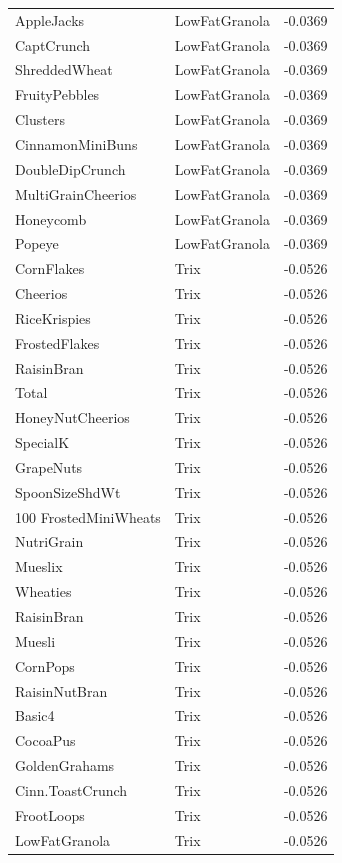 \begin{longtable}{llr}
AppleJacks & LowFatGranola & -0.0369 \\
CaptCrunch & LowFatGranola & -0.0369 \\
ShreddedWheat & LowFatGranola & -0.0369 \\
FruityPebbles & LowFatGranola & -0.0369 \\
Clusters & LowFatGranola & -0.0369 \\
CinnamonMiniBuns & LowFatGranola & -0.0369 \\
DoubleDipCrunch & LowFatGranola & -0.0369 \\
MultiGrainCheerios & LowFatGranola & -0.0369 \\
Honeycomb & LowFatGranola & -0.0369 \\
Popeye & LowFatGranola & -0.0369 \\
CornFlakes & Trix & -0.0526 \\
Cheerios & Trix & -0.0526 \\
RiceKrispies & Trix & -0.0526 \\
FrostedFlakes & Trix & -0.0526 \\
RaisinBran & Trix & -0.0526 \\
Total & Trix & -0.0526 \\
HoneyNutCheerios & Trix & -0.0526 \\
SpecialK & Trix & -0.0526 \\
GrapeNuts & Trix & -0.0526 \\
SpoonSizeShdWt & Trix & -0.0526 \\
100%
FrostedMiniWheats & Trix & -0.0526 \\
NutriGrain & Trix & -0.0526 \\
Mueslix & Trix & -0.0526 \\
Wheaties & Trix & -0.0526 \\
RaisinBran & Trix & -0.0526 \\
Muesli & Trix & -0.0526 \\
CornPops & Trix & -0.0526 \\
RaisinNutBran & Trix & -0.0526 \\
Basic4 & Trix & -0.0526 \\
CocoaPus & Trix & -0.0526 \\
GoldenGrahams & Trix & -0.0526 \\
Cinn.ToastCrunch & Trix & -0.0526 \\
FrootLoops & Trix & -0.0526 \\
LowFatGranola & Trix & -0.0526 \\

\end{longtable}
